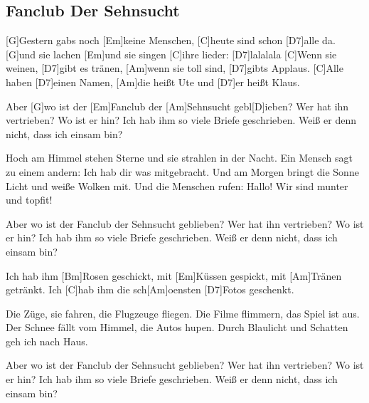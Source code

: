 \subsection*{Fanclub Der Sehnsucht   }
\begin{guitar}

[G]Gestern gabs noch [Em]keine Menschen, [C]heute sind schon [D7]alle da.
[G]und sie lachen [Em]und sie singen [C]ihre lieder: [D7]lalalala
[C]Wenn sie weinen, [D7]gibt es tränen, [Am]wenn sie toll sind, [D7]gibts Applaus.
[C]Alle haben [D7]einen Namen, [Am]die heißt Ute und [D7]er heißt Klaus.



Aber [G]wo ist der [Em]Fanclub der [Am]Sehnsucht gebl[D]ieben?
Wer hat ihn vertrieben? Wo ist er hin? Ich 
hab ihm so viele Briefe geschrieben.
Weiß er denn nicht, dass ich einsam bin?



Hoch am Himmel stehen Sterne und sie strahlen in der Nacht.
Ein Mensch sagt zu einem andern: Ich hab dir was mitgebracht.
Und am Morgen bringt die Sonne Licht und weiße Wolken mit.
Und die Menschen rufen: Hallo! Wir sind munter und topfit!



Aber wo ist der Fanclub der Sehnsucht geblieben?
Wer hat ihn vertrieben? Wo ist er hin? Ich 
hab ihm so viele Briefe geschrieben. 
Weiß er denn nicht, dass ich einsam bin?



Ich hab ihm [Bm]Rosen geschickt, mit [Em]Küssen gespickt,
mit [Am]Tränen getränkt. Ich [C]hab ihm die sch[Am]oensten [D7]Fotos geschenkt. 



Die Züge, sie fahren, die Flugzeuge fliegen.
Die Filme flimmern, das Spiel ist aus. 
Der Schnee fällt vom Himmel, die Autos hupen. 
Durch Blaulicht und Schatten geh ich nach Haus.



Aber wo ist der Fanclub der Sehnsucht geblieben?
Wer hat ihn vertrieben? Wo ist er hin? Ich 
hab ihm so viele Briefe geschrieben. 
Weiß er denn nicht, dass ich einsam bin?
\end{guitar}
